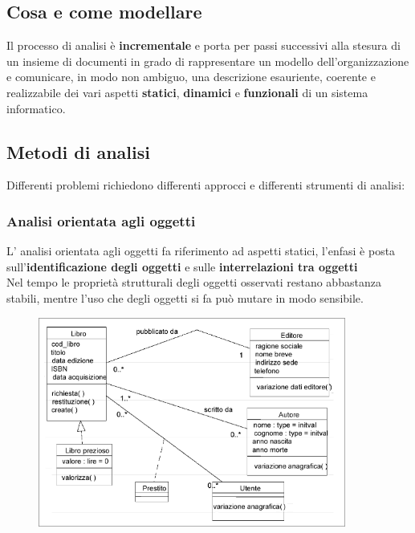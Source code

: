 \documentclass{report}
\begin{document}
            \subsection{Cosa e come modellare}
                Il processo di analisi è \textbf{incrementale} e porta per passi successivi alla stesura di un insieme di documenti in grado di rappresentare un modello dell'organizzazione e comunicare, in modo non ambiguo, una descrizione esauriente, coerente e realizzabile dei vari aspetti \textbf{statici}, \textbf{dinamici} e \textbf{funzionali} di un sistema informatico.
            \subsection{Metodi di analisi}
                Differenti problemi richiedono differenti approcci e differenti strumenti di analisi:
                \subsubsection{Analisi orientata agli oggetti}
                    L' analisi orientata agli oggetti fa riferimento ad aspetti statici, l'enfasi è posta sull'\textbf{identificazione degli oggetti} e sulle \textbf{interrelazioni tra oggetti}
                    \\
                    Nel tempo le proprietà strutturali degli oggetti osservati restano abbastanza stabili, mentre l'uso che degli oggetti si fa può mutare in modo sensibile.
                    \begin{figure}[H]
                        \includegraphics[width=0.9\textwidth]{img/anOg.png}
                    \end{figure}
\end{document}
